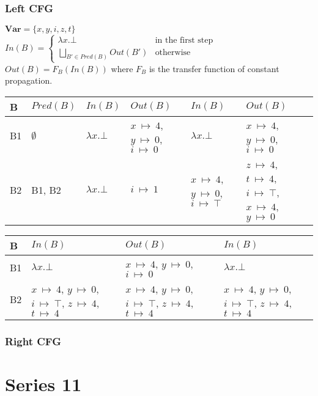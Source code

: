 \documentclass[12pt,fleqn]{article}		%
\begin{document}
\subsubsection{Left CFG}
$ \textbf{Var} = \{x, y, i, z, t\}$\\
$ In(B) = \begin{cases}
\lambda x.\bot & \text{in the first step}\\
\bigsqcup_{B' \in Pred(B)} Out(B') & \text{otherwise}
\end{cases} $\\
$ Out(B) = F_{B}(In(B)) $ where $ F_{B} $ is the transfer function of constant propagation.\\
\begin{tabularx}{\textwidth}{| l | X || X | X || X | X ||}
\hline
B & $Pred(B) $ & $In(B)$ & $Out(B)$ & $In(B)$ & $Out(B)$\\
\hline
B1 & $\emptyset$ & $\lambda x . \bot$ & $x~\mapsto~4$, $y~\mapsto~0$, $i~\mapsto~0$ & $\lambda x . \bot$ & $x~\mapsto~4$, $y~\mapsto~0$, $i~\mapsto~0$ \\
\hline
B2 & B1, B2 & $\lambda x . \bot$ & $i~\mapsto~1$ & $x~\mapsto~4$, $y~\mapsto~0$, $i~\mapsto~\top$ & $z~\mapsto~4$, $t~\mapsto~4$, $i~\mapsto~\top$, $x~\mapsto~4$, $y~\mapsto~0$\\
\hline
\end{tabularx}
\begin{tabularx}{\textwidth}{| l || X | X || X |}
\hline
B & $In(B)$ & $Out(B)$ & $In(B)$\\
\hline
B1 & $\lambda x . \bot$ & $x~\mapsto~4$, $y~\mapsto~0$, $i~\mapsto~0$ & $\lambda x . \bot$\\
\hline
B2 & $x~\mapsto~4$, $y~\mapsto~0$, $i~\mapsto~\top$, $z~\mapsto~4$, $t~\mapsto~4$ & $x~\mapsto~4$, $y~\mapsto~0$, $i~\mapsto~\top$, $z~\mapsto~4$, $t~\mapsto~4$ & $x~\mapsto~4$, $y~\mapsto~0$, $i~\mapsto~\top$, $z~\mapsto~4$, $t~\mapsto~4$\\
\hline
\end{tabularx}

\subsubsection{Right CFG}

\section{Series 11}
\end{document}
